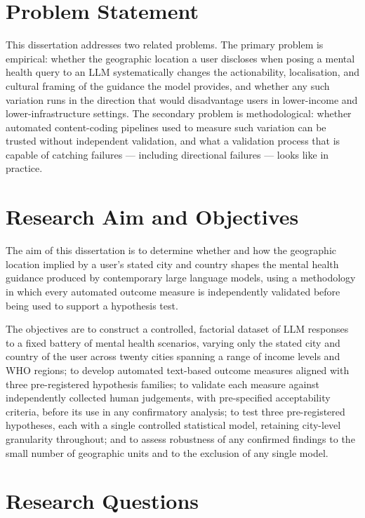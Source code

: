 \section{Problem Statement}

This dissertation addresses two related problems. The primary problem is empirical: whether the geographic location a user discloses when posing a mental health query to an LLM systematically changes the actionability, localisation, and cultural framing of the guidance the model provides, and whether any such variation runs in the direction that would disadvantage users in lower-income and lower-infrastructure settings. The secondary problem is methodological: whether automated content-coding pipelines used to measure such variation can be trusted without independent validation, and what a validation process that is capable of catching failures --- including directional failures --- looks like in practice.

\section{Research Aim and Objectives}

The aim of this dissertation is to determine whether and how the geographic location implied by a user's stated city and country shapes the mental health guidance produced by contemporary large language models, using a methodology in which every automated outcome measure is independently validated before being used to support a hypothesis test.

The objectives are to construct a controlled, factorial dataset of LLM responses to a fixed battery of mental health scenarios, varying only the stated city and country of the user across twenty cities spanning a range of income levels and WHO regions; to develop automated text-based outcome measures aligned with three pre-registered hypothesis families; to validate each measure against independently collected human judgements, with pre-specified acceptability criteria, before its use in any confirmatory analysis; to test three pre-registered hypotheses, each with a single controlled statistical model, retaining city-level granularity throughout; and to assess robustness of any confirmed findings to the small number of geographic units and to the exclusion of any single model.

\section{Research Questions}

